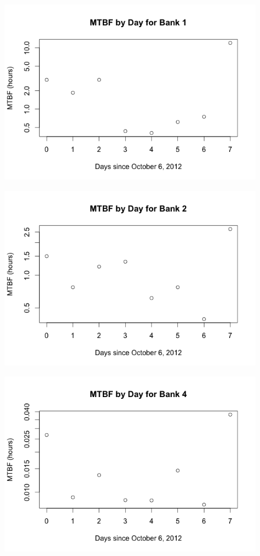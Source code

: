 \begin{figure}[h]
\centering
\includegraphics{images/mtbf_1.png}
\end{figure}

\begin{figure}[h]
\centering
\includegraphics{images/mtbf_2.png}
\end{figure}

\begin{figure}[h]
\centering
\includegraphics{images/mtbf_4.png}
\end{figure}

